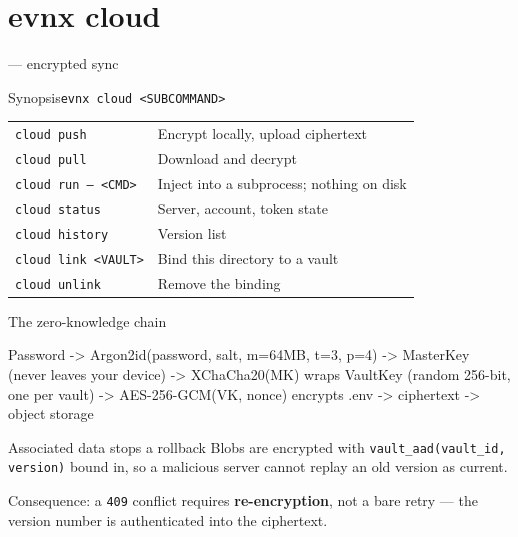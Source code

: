 \section{evnx cloud}

\begin{frame}{ — encrypted sync}
  \begin{block}{Synopsis}\texttt{evnx cloud <SUBCOMMAND>}\end{block}

  \begin{tabular}{@{}ll@{}}
    \toprule
    \texttt{cloud push}   & Encrypt locally, upload ciphertext \\
    \texttt{cloud pull}   & Download and decrypt \\
    \texttt{cloud run -- <CMD>} & Inject into a subprocess; nothing on disk \\
    \texttt{cloud status} & Server, account, token state \\
    \texttt{cloud history}& Version list \\
    \texttt{cloud link <VAULT>} & Bind this directory to a vault \\
    \texttt{cloud unlink} & Remove the binding \\
    \bottomrule
  \end{tabular}
\end{frame}

\begin{frame}[fragile]{The zero-knowledge chain}
\begin{semiverbatim}\scriptsize
Password
  -> Argon2id(password, salt, m=64MB, t=3, p=4)
       -> MasterKey            (never leaves your device)
           -> XChaCha20(MK) wraps VaultKey   (random 256-bit, one per vault)
               -> AES-256-GCM(VK, nonce) encrypts .env
                   -> ciphertext -> object storage
\end{semiverbatim}

  \vspace{0.5em}
  \begin{block}{Associated data stops a rollback}
    Blobs are encrypted with \texttt{vault\_aad(vault\_id, version)} bound in, so
    a malicious server cannot replay an old version as current.

    \vspace{0.3em}
    {\footnotesize Consequence: a \texttt{409} conflict requires
    \textbf{re-encryption}, not a bare retry — the version number is
    authenticated into the ciphertext.}
  \end{block}
\end{frame}

